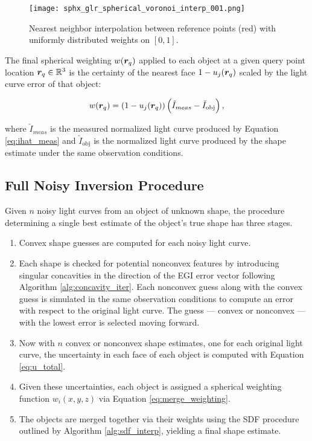 \begin{figure}[!htb]
  \centering
  \texttt{[image: sphx\_glr\_spherical\_voronoi\_interp\_001.png]}
  \caption{Nearest neighbor interpolation between reference points (red) with uniformly distributed weights on $[0,1]$.}
  \label{fig:ball_tree_nn_interp}
\end{figure}

The final spherical weighting $w(\bm{r}_q)$ applied to each object at a given query point location $\bm{r}_q \in \mathbb{R}^3$ is the certainty of the nearest face $1-u_j(\bm{r}_q)$ scaled by the light curve error of that object:

\begin{equation} \label{eq:merge_weighting}
  w(\bm{r}_q) = \left( 1-u_j(\bm{r}_q) \right) \left( \check{I}_{meas} - \check{I}_\mathrm{obj} \right),
\end{equation}

where $\check{I}_{meas}$ is the measured normalized light curve produced by Equation \ref{eq:ihat_meas} and $\check{I}_\mathrm{obj}$ is the normalized light curve produced by the shape estimate under the same observation conditions.

\subsection{Full Noisy Inversion Procedure} \label{sec:mh_inversion}

Given $n$ noisy light curves from an object of unknown shape, the procedure determining a single best estimate of the object's true shape has three stages. 

\begin{enumerate}
  \item Convex shape guesses are computed for each noisy light curve.
  \item Each shape is checked for potential nonconvex features by introducing singular concavities in the direction of the EGI error vector following Algorithm \ref{alg:concavity_iter}. Each nonconvex guess along with the convex guess is simulated in the same observation conditions to compute an error with respect to the original light curve. The guess --- convex or nonconvex --- with the lowest error is selected moving forward.
  \item Now with $n$ convex or nonconvex shape estimates, one for each original light curve, the uncertainty in each face of each object is computed with Equation \ref{eq:u_total}.
  \item Given these uncertainties, each object is assigned a spherical weighting function $w_i(x, y, z)$ via Equation \ref{eq:merge_weighting}.
  \item The objects are merged together via their weights using the SDF procedure outlined by Algorithm \ref{alg:sdf_interp}, yielding a final shape estimate.
\end{enumerate}

